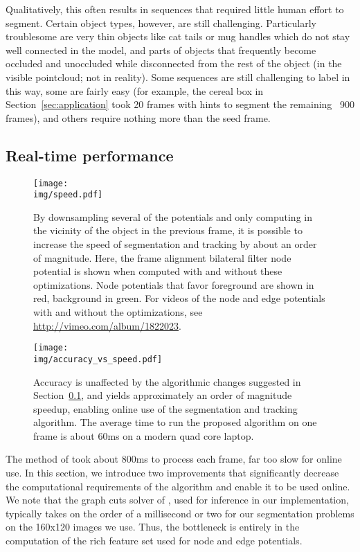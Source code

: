 \documentclass[conference]{IEEEtran}
\newcommand{\img}{img}
\begin{document}
Qualitatively, this often results in sequences that required little human effort to segment.  Certain object types, however, are still challenging.  Particularly troublesome are very thin objects like cat tails or mug handles which do not stay well connected in the model, and parts of objects that frequently become occluded and unoccluded while disconnected from the rest of the object (in the visible pointcloud; not in reality).  Some sequences are still challenging to label in this way, some are fairly easy (for example, the cereal box in Section~\ref{sec:application} took 20 frames with hints to segment the remaining ~900 frames), and others require nothing more than the seed frame.


\subsection{Real-time performance}
\label{sec:speed}

\begin{figure}
  \centering
  \texttt{[image: \\img/speed.pdf]}
  \caption{By downsampling several of the potentials and only computing in the vicinity of the object in the previous frame, it is possible to increase the speed of segmentation and tracking by about an order of magnitude.  Here, the frame alignment bilateral filter node potential is shown when computed with and without these optimizations.  Node potentials that favor foreground are shown in red, background in green.  For videos of the node and edge potentials with and without the optimizations, see \href{http://vimeo.com/album/1822023}{http://vimeo.com/album/1822023}.}
  \label{fig:speed}
\end{figure}


\begin{figure}
  \centering
  \texttt{[image: \\img/accuracy\_vs\_speed.pdf]}
  \caption{Accuracy is unaffected by the algorithmic changes suggested in Section~\ref{sec:speed}, and yields approximately an order of magnitude speedup, enabling online use of the segmentation and tracking algorithm.  The average time to run the proposed algorithm on one frame is about 60ms on a modern quad core laptop.}
  \label{fig:avs}
\end{figure}


The method of \cite{teichman2012a} took about 800ms to process each frame, far too slow for online use.  In this section, we introduce two improvements that significantly decrease the computational requirements of the algorithm and enable it to be used online. We note that the graph cuts solver of \citet{boykov2001a}, used for inference in our implementation, typically takes on the order of a millisecond or two for our segmentation problems on the 160x120 images we use.  Thus, the bottleneck is entirely in the computation of the rich feature set used for node and edge potentials.
\end{document}
